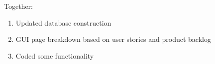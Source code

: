 \documentclass[11pt]{book}
\begin{document}
Together:
\begin{enumerate}
\item Updated database construction
\item GUI page breakdown based on user stories and product backlog
\item Coded some functionality
\end{enumerate}
\end{document}
